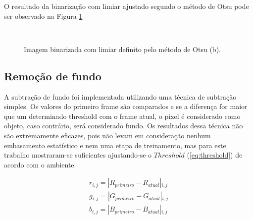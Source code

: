 \documentclass[12pt]{article}
\begin{document}
O resultado da binarização com limiar ajustado segundo o método de Otsu pode
ser observado na Figura \ref{fig:bin_otsu}

\begin{figure}[H]
\centering
\mbox{\quad
{}}
\caption{ Imagem binarizada com limiar definito pelo método de Otsu (b). }
\label{fig:bin_otsu}
\end{figure}

\subsection{Remoção de fundo}

A subtração de fundo foi implementada utilizando uma técnica de subtração
simples. Os valores do primeiro frame são comparados e se a diferença for maior que um determinado threshold com o frame atual, o pixel é considerado como objeto, caso contrário, será considerado fundo. Os resultados dessa técnica não são extremamente eficazes, pois não levam em consideração nenhum embasamento estatístico e nem uma etapa de treinamento, mas para este trabalho mostraram-se suficientes ajustando-se o $Threshold$ (\ref{eq:threshold}) de acordo com o ambiente.

\begin{subequations} \label{eq:r}
\begin{align}
r{_{i, j}} = \left|R{_{primeiro}} - R{_{atual}}\right |{_{i,j}} 
\\
g{_{i, j}} = \left|G{_{primeiro}} - G{_{atual}}\right |{_{i,j}} 
\\
b{_{i, j}} = \left|B{_{primeiro}} - B{_{atual}}\right |{_{i,j}} 
\end{align}
\end{subequations}
\end{document}
